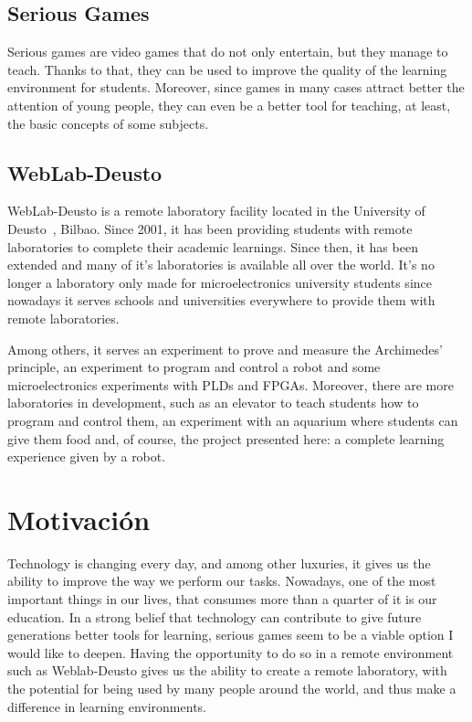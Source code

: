 \subsection{Serious Games}

Serious games are video games that do not only entertain, but they manage to teach. Thanks to that,
they can be used to improve the quality of the learning environment for students. Moreover, since
games in many cases attract better the attention of young people, they can even be a better tool for
teaching, at least, the basic concepts of some subjects.

\subsection{WebLab-Deusto}

WebLab-Deusto is a remote laboratory facility located in the University of Deusto~\cite{weblab},
Bilbao. Since 2001, it has been providing students with remote laboratories to complete their
academic learnings. Since then, it has been extended and many of it's laboratories is available
all over the world. It's no longer a laboratory only made for microelectronics university students
since nowadays it serves schools and universities everywhere to provide them with remote
laboratories.

Among others, it serves an experiment to prove and measure the Archimedes' principle, an experiment
to program and control a robot and some microelectronics experiments with PLDs and FPGAs. Moreover,
there are more laboratories in development, such as an elevator to teach students how to program and
control them, an experiment with an aquarium where students can give them food and, of course, the
project presented here: a complete learning experience given by a robot.

\section{Motivación}

Technology is changing every day, and among other luxuries, it gives us the ability to improve the
way we perform our tasks. Nowadays, one of the most important things in our lives, that consumes
more than a quarter of it is our education. In a strong belief that technology can contribute to
give future generations better tools for learning, serious games seem to be a viable option I would
like to deepen. Having the opportunity to do so in a remote environment such as Weblab-Deusto gives
us the ability to create a remote laboratory, with the potential for being used by many people
around the world, and thus make a difference in learning environments.

